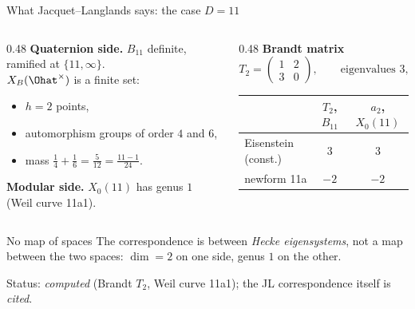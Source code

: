 \begin{frame}{What Jacquet--Langlands says: the case $D=11$}
  \begin{columns}[T]
    \begin{column}{0.48\textwidth}
      \textbf{Quaternion side.} $B_{11}$ definite, ramified at $\{11,\infty\}$.\\[2pt]
      $X_B(\Ohat^\times)$ is a finite set:
      \begin{itemize}
        \item %
          $h=2$ points,
        \item %
          automorphism groups of order $4$ and $6$,
        \item %
          mass $\tfrac14+\tfrac16=\tfrac5{12}=\tfrac{11-1}{24}$.
      \end{itemize}
      \medskip
      \textbf{Modular side.} $X_0(11)$ has genus %
      $1$ (Weil curve 11a1).
    \end{column}
    \begin{column}{0.48\textwidth}
      \textbf{Brandt matrix} %
      \[
        T_2=\begin{pmatrix}1&2\\3&0\end{pmatrix},\qquad
        \text{eigenvalues } 3,\ -2 .
      \]
      {\footnotesize\begin{tabular}{@{}lcc@{}}
        \toprule
        & $T_2$, $B_{11}$ & $a_2$, $X_0(11)$\\
        \midrule
        Eisenstein (const.) & $3$ & $3$\\
        newform 11a & $-2$ & $-2$\\
        \bottomrule
      \end{tabular}}
    \end{column}
  \end{columns}
  \vspace{4pt}
  \begin{block}{No map of spaces}
    The correspondence is between \emph{Hecke eigensystems}, not a map between the
    two spaces: $\dim=2$ on one side, genus $1$ on the other.
  \end{block}
  {\tiny Status: \emph{computed} (Brandt $T_2$, Weil curve 11a1); the JL correspondence itself is \emph{cited}.}
\end{frame}
